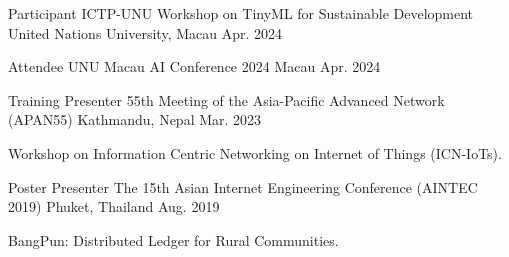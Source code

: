 \begin{cventries}
	\cventry
	{Participant} %
	{ICTP-UNU Workshop on TinyML for Sustainable Development} %
	{United Nations University, Macau} %
	{Apr. 2024} %
	{}
	
	\cventry
	{Attendee}
	{UNU Macau AI Conference 2024}
	{Macau}
	{Apr. 2024}
	{}
	
	\cventry
	{Training Presenter} %
	{55th Meeting of the Asia-Pacific Advanced Network (APAN55)} %
	{Kathmandu, Nepal} %
	{Mar. 2023} %
	{
		\begin{cvitems} %
			\item {Workshop on Information Centric Networking on Internet of Things (ICN-IoTs).}
		\end{cvitems}
	}
	
	\cventry
	{Poster Presenter} %
	{The 15th Asian Internet Engineering Conference (AINTEC 2019)} %
	{Phuket, Thailand} %
	{Aug. 2019} %
	{
		\begin{cvitems} %
			\item { BangPun: Distributed Ledger for Rural Communities.}
		\end{cvitems}
	}

\end{cventries}



